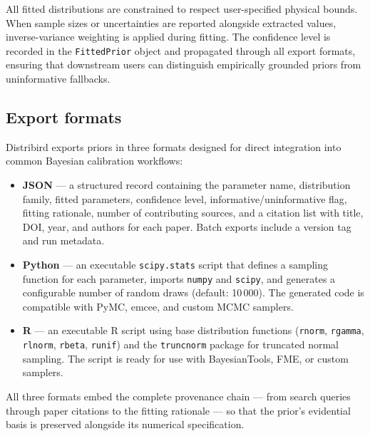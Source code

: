 \documentclass[11pt,a4paper]{article}
\begin{document}

\noindent All fitted distributions are constrained to respect user-specified physical bounds. When sample sizes or uncertainties are reported alongside extracted values, inverse-variance weighting is applied during fitting. The confidence level is recorded in the \texttt{FittedPrior} object and propagated through all export formats, ensuring that downstream users can distinguish empirically grounded priors from uninformative fallbacks.

\subsection{Export formats}

Distribird exports priors in three formats designed for direct integration into common Bayesian calibration workflows:

\begin{itemize}
  \item \textbf{JSON} --- a structured record containing the parameter name, distribution family, fitted parameters, confidence level, informative/uninformative flag, fitting rationale, number of contributing sources, and a citation list with title, DOI, year, and authors for each paper. Batch exports include a version tag and run metadata.

  \item \textbf{Python} --- an executable \texttt{scipy.stats} script that defines a sampling function for each parameter, imports \texttt{numpy} and \texttt{scipy}, and generates a configurable number of random draws (default: 10\,000). The generated code is compatible with PyMC, emcee, and custom MCMC samplers.

  \item \textbf{R} --- an executable R script using base distribution functions (\texttt{rnorm}, \texttt{rgamma}, \texttt{rlnorm}, \texttt{rbeta}, \texttt{runif}) and the \texttt{truncnorm} package for truncated normal sampling. The script is ready for use with BayesianTools, FME, or custom samplers.
\end{itemize}

\noindent All three formats embed the complete provenance chain --- from search queries through paper citations to the fitting rationale --- so that the prior's evidential basis is preserved alongside its numerical specification.
\end{document}
